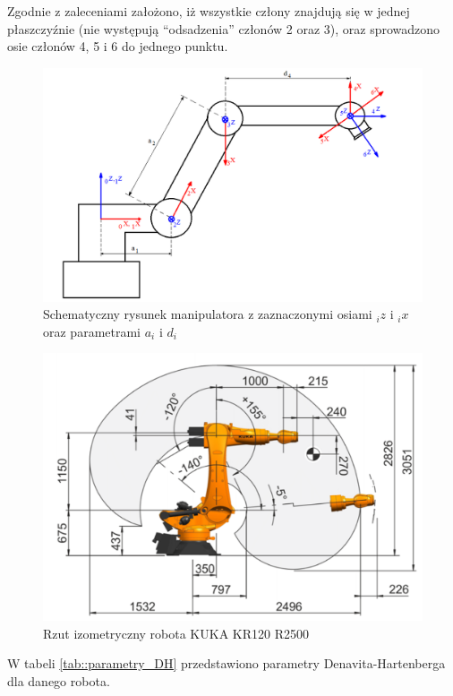\documentclass{article}
\begin{document}
Zgodnie z zaleceniami założono, iż wszystkie człony znajdują się w jednej płaszczyźnie (nie występują ``odsadzenia'' członów 2 oraz 3), oraz sprowadzono osie członów 4, 5 i 6 do jednego punktu.

\begin{figure}[H]
	\centering
	\includegraphics[width=\textwidth]{kinematyka_wymiary.png}
	\caption{Schematyczny rysunek manipulatora z zaznaczonymi osiami $_i z$ i $_i x$ oraz parametrami $a_i$ i $d_i$}
	\label{fig::kinematyka}
\end{figure}

\begin{figure}[H]
	\centering
	\includegraphics[width=\textwidth]{KR120_R2500.png}
	\caption{Rzut izometryczny robota KUKA KR120 R2500}
	\label{fig::robot_kr120}
\end{figure}



W tabeli \ref{tab::parametry_DH} przedstawiono parametry Denavita-Hartenberga dla danego robota.
\end{document}
